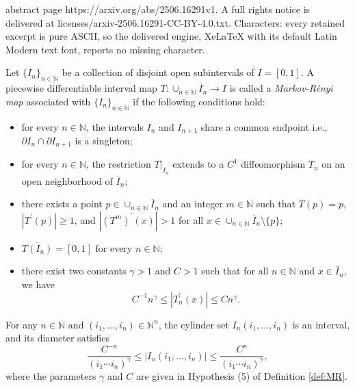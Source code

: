 \documentclass[10pt,a4paper]{amsart}
\begin{document}
abstract page https://arxiv.org/abs/2506.16291v1. A full rights notice is delivered at licenses/arxiv-2506.16291-CC-BY-4.0.txt. Characters: every retained excerpt is pure ASCII, so the delivered engine, XeLaTeX with its default Latin Modern text font, reports no missing character.
\begin{definition}\label{def:MR}
Let $\{I_n\}_{n \in \mathbb N}$ be a collection of disjoint open subintervals of $I=[0,1]$.
A piecewise differentiable interval map $T: \cup_{n \in \mathbb N}\overline{I}_n \to I$ is called a \emph{Markov-R\'{e}nyi map} associated with $\{I_n\}_{n \in \mathbb N}$ if the following conditions hold:
\begin{itemize}
    \item[(1).] for every $n\in \mathbb{N}$, the intervals $I_n$ and $I_{n+1}$ share a common endpoint i.e., $\partial I_{n}\cap\partial I_{n+1}$ is a singleton;
     \item[(2).] for every $n\in \mathbb{N}$, the restriction $T|_{I_n}$ extends to a $C^{1}$ diffeomorphism $T_n$ on an open neighborhood of $\overline{I}_n$;
    \item[(3).] there exists a point $p \in \cup_{n \in \mathbb N}\overline{I}_n$ and an integer $m\in \mathbb{N}$ such that $T(p)=p$, $|T^\prime(p)| \geq 1$, and $|(T^m)^\prime(x)|>1$ for all $x\in \cup_{n \in \mathbb N}\overline{I}_n\setminus \{p\}$;
    \item[(4).] $\overline{T(I_n)}=[0,1]$ for every $n\in \mathbb{N}$;
    \item[(5).] there exist two constants $\gamma>1$ and $C>1$ such that for all $n \in \mathbb{N}$ and $x \in \overline{I}_n$, we have
    \begin{equation*}
        C^{-1}n^{\gamma}\leq |T^\prime_n(x)|\leq Cn^{\gamma}.
    \end{equation*}
\end{itemize}
\end{definition}

\begin{proposition}\label{p.cylinder}
For any $n\in \mathbb N$ and $(i_1,\dots, i_n)\in \mathbb N^n$, the cylinder set $I_n(i_1,\dots,i_n)$ is an interval, and its diameter satisfies
\begin{equation*}\label{e.cylinder}
   \frac{C^{-n}}{(i_1 \cdots i_{n})^{\gamma}}
   \leq |I_n(i_1,\dots,i_n)|
   \leq \frac{C^{n}}{(i_1 \cdots i_{n})^{\gamma}},
\end{equation*}
where the parameters $\gamma$ and $C$ are given in Hypothesis (5) of Definition \ref{def:MR}.
\end{proposition}
\end{document}
